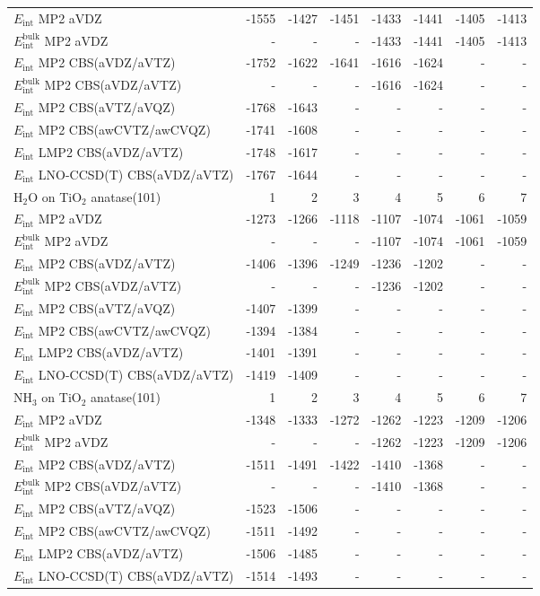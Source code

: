 \begin{longtable}{lrrrrrrr}
\midrule
$E_\text{int}$ MP2 aVDZ & -1555 & -1427 & -1451 & -1433 & -1441 & -1405 & -1413 \\
$E_\text{int}^\text{bulk}$ MP2 aVDZ & - & - & - & -1433 & -1441 & -1405 & -1413 \\
$E_\text{int}$ MP2 CBS(aVDZ/aVTZ) & -1752 & -1622 & -1641 & -1616 & -1624 & - & - \\
$E_\text{int}^\text{bulk}$ MP2 CBS(aVDZ/aVTZ) & - & - & - & -1616 & -1624 & - & - \\
$E_\text{int}$ MP2 CBS(aVTZ/aVQZ) & -1768 & -1643 & - & - & - & - & - \\
$E_\text{int}$ MP2 CBS(awCVTZ/awCVQZ) & -1741 & -1608 & - & - & - & - & - \\
$E_\text{int}$ LMP2 CBS(aVDZ/aVTZ) & -1748 & -1617 & - & - & - & - & - \\
$E_\text{int}$ LNO-CCSD(T) CBS(aVDZ/aVTZ) & -1767 & -1644 & - & - & - & - & - \\
\toprule
H$_2$O on TiO$_2$ anatase(101) & 1 & 2 & 3 & 4 & 5 & 6 & 7 \\ 
\midrule
$E_\text{int}$ MP2 aVDZ & -1273 & -1266 & -1118 & -1107 & -1074 & -1061 & -1059 \\
$E_\text{int}^\text{bulk}$ MP2 aVDZ & - & - & - & -1107 & -1074 & -1061 & -1059 \\
$E_\text{int}$ MP2 CBS(aVDZ/aVTZ) & -1406 & -1396 & -1249 & -1236 & -1202 & - & - \\
$E_\text{int}^\text{bulk}$ MP2 CBS(aVDZ/aVTZ) & - & - & - & -1236 & -1202 & - & - \\
$E_\text{int}$ MP2 CBS(aVTZ/aVQZ) & -1407 & -1399 & - & - & - & - & - \\
$E_\text{int}$ MP2 CBS(awCVTZ/awCVQZ) & -1394 & -1384 & - & - & - & - & - \\
$E_\text{int}$ LMP2 CBS(aVDZ/aVTZ) & -1401 & -1391 & - & - & - & - & - \\
$E_\text{int}$ LNO-CCSD(T) CBS(aVDZ/aVTZ) & -1419 & -1409 & - & - & - & - & - \\
\toprule
NH$_3$ on TiO$_2$ anatase(101) & 1 & 2 & 3 & 4 & 5 & 6 & 7 \\ 
\midrule
$E_\text{int}$ MP2 aVDZ & -1348 & -1333 & -1272 & -1262 & -1223 & -1209 & -1206 \\
$E_\text{int}^\text{bulk}$ MP2 aVDZ & - & - & - & -1262 & -1223 & -1209 & -1206 \\
$E_\text{int}$ MP2 CBS(aVDZ/aVTZ) & -1511 & -1491 & -1422 & -1410 & -1368 & - & - \\
$E_\text{int}^\text{bulk}$ MP2 CBS(aVDZ/aVTZ) & - & - & - & -1410 & -1368 & - & - \\
$E_\text{int}$ MP2 CBS(aVTZ/aVQZ) & -1523 & -1506 & - & - & - & - & - \\
$E_\text{int}$ MP2 CBS(awCVTZ/awCVQZ) & -1511 & -1492 & - & - & - & - & - \\
$E_\text{int}$ LMP2 CBS(aVDZ/aVTZ) & -1506 & -1485 & - & - & - & - & - \\
$E_\text{int}$ LNO-CCSD(T) CBS(aVDZ/aVTZ) & -1514 & -1493 & - & - & - & - & - \\
\end{longtable}